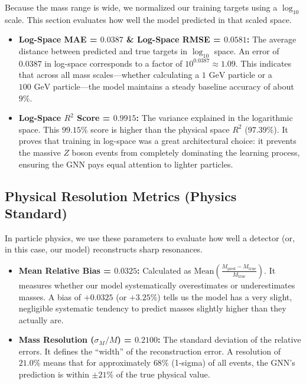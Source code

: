 \documentclass[11pt,a4paper]{article}
\begin{document}
Because the mass range is wide, we normalized our training targets using a $\log_{10}$ scale. This section evaluates how well the model predicted in that scaled space.

\begin{itemize}
    \item \textbf{Log-Space MAE = $0.0387$ \& Log-Space RMSE = $0.0581$:} 
    The average distance between predicted and true targets in $\log_{10}$ space. An error of $0.0387$ in log-space corresponds to a factor of $10^{0.0387} \approx 1.09$. This indicates that across all mass scales—whether calculating a $1\text{ GeV}$ particle or a $100\text{ GeV}$ particle—the model maintains a steady baseline accuracy of about $9\%$.
    
    \item \textbf{Log-Space $R^2$ Score = $0.9915$:} 
    The variance explained in the logarithmic space. This $99.15\%$ score is higher than the physical space $R^2$ ($97.39\%$). It proves that training in log-space was a great architectural choice: it prevents the massive $Z$ boson events from completely dominating the learning process, ensuring the GNN pays equal attention to lighter particles.
\end{itemize}

\subsection{Physical Resolution Metrics (Physics Standard)}

In particle physics, we use these parameters to evaluate how well a detector (or, in this case, our model) reconstructs sharp resonances.

\begin{itemize}
    \item \textbf{Mean Relative Bias = $0.0325$:} 
    Calculated as $\text{Mean}(\frac{M_{\text{pred}} - M_{\text{true}}}{M_{\text{true}}})$. It measures whether our model systematically overestimates or underestimates masses. A bias of $+0.0325$ (or $+3.25\%$) tells us the model has a very slight, negligible systematic tendency to predict masses slightly higher than they actually are.
    
    \item \textbf{Mass Resolution ($\sigma_M / M$) = $0.2100$:} 
    The standard deviation of the relative errors. It defines the ``width'' of the reconstruction error. A resolution of $21.0\%$ means that for approximately $68\%$ (1-sigma) of all events, the GNN's prediction is within $\pm 21\%$ of the true physical value.
\end{itemize}
\end{document}
